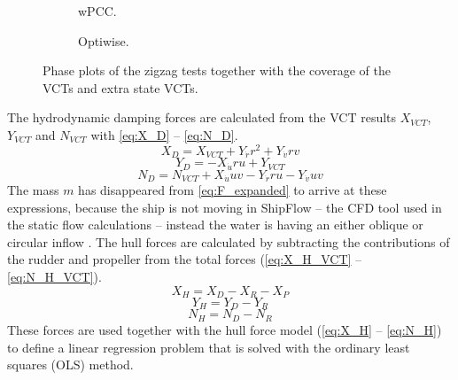 \begin{figure}[H]
     \centering
     \begin{subfigure}[b]{0.49\textwidth}
         \centering
         
        \caption{wPCC.}
        \label{fig:VCT_phase_plot_wPCC}
     \end{subfigure}
     \hfill
     \begin{subfigure}[b]{0.49\textwidth}
        \centering
        
        \caption{Optiwise.}
        \label{fig:VCT_phase_plot_optiwise}
     \end{subfigure}
        \caption{Phase plots of the zigzag tests together with the coverage of the VCTs and extra state VCTs.}
        \label{fig:phase_plots}
\end{figure}

The hydrodynamic damping forces are calculated from the VCT results $X_{VCT}$, $Y_{VCT}$ and $N_{VCT}$
with \autoref{eq:X_D} -- \autoref{eq:N_D}.
\begin{equation}
    \label{eq:X_D}
    X_{D} = X_{VCT} + Y_{\dot{r}} r^{2} + Y_{\dot{v}} r v
\end{equation}
\begin{equation}
    \label{eq:Y_D}
    Y_{D} = - X_{\dot{u}} r u + Y_{VCT}
\end{equation}
\begin{equation}
    \label{eq:N_D}
    N_{D} = N_{VCT} + X_{\dot{u}} u v - Y_{\dot{r}} r u - Y_{\dot{v}} u v
\end{equation}
The mass $m$ has disappeared from \autoref{eq:F_expanded} to arrive at these expressions, because the ship is not moving in ShipFlow -- the CFD tool used in the static flow calculations -- instead the water is having an either oblique or circular inflow \cite{roychoudhuryCFDSimulationsSteady2017}.
The hull forces are calculated by subtracting the contributions of the rudder and propeller from the total forces (\autoref{eq:X_H_VCT} -- \autoref{eq:N_H_VCT}).
\begin{equation}
    \label{eq:X_H_VCT}
    X_H = X_D - X_R - X_P
\end{equation}
\begin{equation}
    \label{eq:Y_H_VCT}
    Y_H = Y_D - Y_R
\end{equation}
\begin{equation}
    \label{eq:N_H_VCT}
    N_H = N_D - N_R
\end{equation}
These forces are used together with the hull force model (\autoref{eq:X_H} -- \autoref{eq:N_H}) to define a linear regression problem that is solved with the ordinary least squares (OLS) method. 